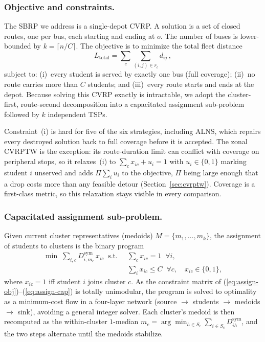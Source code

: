 \documentclass[graybox]{SNmult}
\begin{document}
\subsubsection{Objective and constraints.}
The SBRP we address is a single-depot CVRP. A solution is a set of
closed routes, one per bus, each starting and ending at $o$. The
number of buses is lower-bounded by
$k=\lceil n/C\rceil$. The objective is to minimize the total fleet
distance
\begin{equation}
L_{\mathrm{total}}=\sum_{c}\sum_{(i,j)\in r_c} d_{ij}\,,
\label{eq:obj}
\end{equation}
subject to: (i)~every student is served by exactly one bus (full
coverage); (ii)~no route carries more than $C$ students; and
(iii)~every route starts and ends at the depot. Because solving this
CVRP exactly is intractable, we adopt the cluster-first, route-second
decomposition into a capacitated assignment sub-problem followed by
$k$ independent TSPs.

Constraint~(i) is hard for five of the six strategies, including ALNS,
which repairs every destroyed solution back to full coverage before it is
accepted. The zonal CVRPTW is the exception: its route-duration limit can
conflict with coverage on peripheral stops, so it relaxes~(i) to
$\sum_{c} x_{ic}+u_i=1$ with $u_i\in\{0,1\}$ marking student $i$
unserved and adds $\Pi\sum_i u_i$ to the objective, $\Pi$ being large
enough that a drop costs more than any feasible detour
(Section~\ref{sec:cvrptw}). Coverage is a first-class metric, so this
relaxation stays visible in every comparison.

\subsubsection{Capacitated assignment sub-problem.}
Given current cluster representatives (medoids)
$M=\{m_1,\dots,m_k\}$, the assignment of students to clusters is the
binary program
\begin{align}
\min\; \sum_{i,c} D^{\mathrm{sym}}_{i,m_c}\,x_{ic}
\;\;\text{s.t.}\;\; & \textstyle\sum_{c} x_{ic}=1\;\;\forall i,
\label{eq:assign-obj}\\
& \textstyle\sum_{i} x_{ic}\le C\;\;\forall c,\quad x_{ic}\in\{0,1\},
\label{eq:assign-cap}
\end{align}
where $x_{ic}=1$ iff student $i$ joins cluster $c$. As the constraint
matrix of (\ref{eq:assign-obj})--(\ref{eq:assign-cap}) is totally
unimodular, the program is solved to optimality as a minimum-cost flow
in a four-layer network (source $\to$ students $\to$ medoids $\to$ sink),
avoiding a general integer solver. Each cluster's medoid is then
recomputed as the within-cluster $1$-median
$m_c=\arg\min_{h\in S_c}\sum_{i\in S_c} D^{\mathrm{sym}}_{ih}$, and the
two steps alternate until the medoids stabilize.
\end{document}

